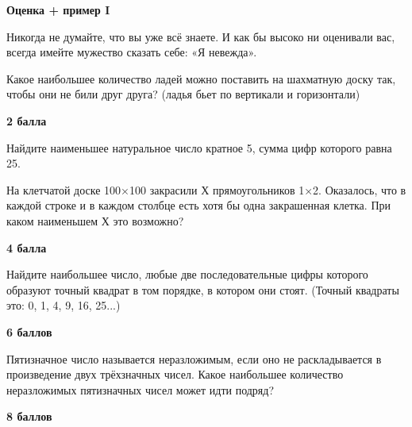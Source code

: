 \centerline{\bf \Huge Оценка + пример I}

\begin{flushright}
        \scriptsize{Никогда не думайте, что вы уже всё знаете. И как бы высоко ни оценивали вас, всегда имейте мужество сказать себе: «Я невежда».}
\end{flushright}

 Какое наибольшее количество ладей можно поставить на шахматную доску так, чтобы они не били друг друга? (ладья бьет по вертикали и горизонтали)

\begin{flushright} \textbf{2 балла}\\ 
\end{flushright}

 Найдите наименьшее натуральное число кратное 5, сумма цифр которого равна 25.

 На клетчатой доске 100×100 закрасили Х прямоугольников 1×2.
Оказалось, что в каждой строке и в каждом столбце есть хотя
бы одна закрашенная клетка. При каком наименьшем Х это
возможно?

\begin{flushright} \textbf{4 балла}\\ 
\end{flushright}

 Найдите наибольшее число, любые две последовательные цифры которого образуют точный квадрат в том порядке, в котором они стоят. (Точный квадраты это: 0, 1, 4, 9, 16, 25...)

\begin{flushright} \textbf{6 баллов}\\ 
\end{flushright}

 Пятизначное число называется неразложимым, если оно не
раскладывается в произведение двух трёхзначных чисел. Какое
наибольшее количество неразложимых пятизначных чисел может идти
подряд?

\begin{flushright} \textbf{8 баллов}\\ 
\end{flushright}
